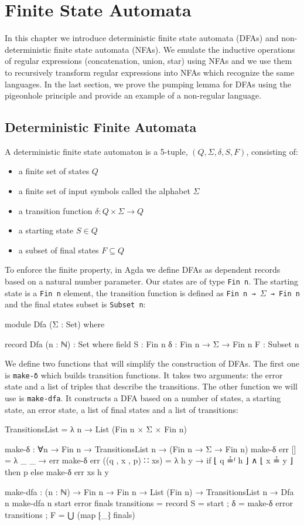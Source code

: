 
\chapter{Finite State Automata}
In this chapter we introduce deterministic finite state automata (DFAs) and non-deterministic finite state automata (NFAs). We emulate the inductive operations of regular expressions (concatenation, union, star) using NFAs and we use them to recursively transform regular expressions into NFAs which recognize the same languages. In the last section, we prove the pumping lemma for DFAs using the pigeonhole principle and provide an example of a non-regular language.
\section{Deterministic Finite Automata}
A deterministic finite state automaton is a 5-tuple, $(Q,\Sigma ,\delta ,S,F)$, consisting of:
\begin{itemize}
    \item a finite set of states $Q$
    \item a finite set of input symbols called the alphabet $\Sigma$ 
    \item a transition function $\delta:Q\times \Sigma \rightarrow Q$
    \item a starting state $S\in Q$
    \item a subset of final states $F\subseteq Q$
\end{itemize}
To enforce the finite property, in Agda we define DFAs as dependent records based on a natural number parameter. Our states are of type \texttt{Fin n}. The starting state is a \texttt{Fin n} element, the transition function is defined as \texttt{Fin n → $\Sigma$ → Fin n} and the final states subset is \texttt{Subset n}:
\begin{agda}
module Dfa (Σ : Set) where

record Dfa (n : ℕ) : Set where
  field
    S : Fin n
    δ : Fin n → Σ → Fin n
    F : Subset n
\end{agda}
We define two functions that will simplify the construction of DFAs. The first one is \texttt{make-δ} which builds transition functions. It takes two arguments: the error state and a list of triples that describe the transitions. The other function we will use is \texttt{make-dfa}. It constructs a DFA based on a number of states, a starting state, an error state, a list of final states and a list of transitions:
\begin{agda}
TransitionsList = λ n → List (Fin n × Σ × Fin n)

make-δ : ∀{n}
    → Fin n
    → TransitionsList n
    → (Fin n → Σ → Fin n)
make-δ err [] = λ _ _ → err
make-δ err ((q , x , p) ∷ xs)
    = λ h y → if ⌊ q ≟ᶠ h ⌋ ∧ ⌊ x ≟ y ⌋
                then p
                else make-δ err xs h y

make-dfa : (n : ℕ)
    → Fin n
    → Fin n
    → List (Fin n)
    → TransitionsList n
    → Dfa n
make-dfa n start error finals transitions
    = record
      { S = start
      ; δ = make-δ error transitions
      ; F = ⋃ (map ⁅_⁆ finals)
      }
\end{agda}
